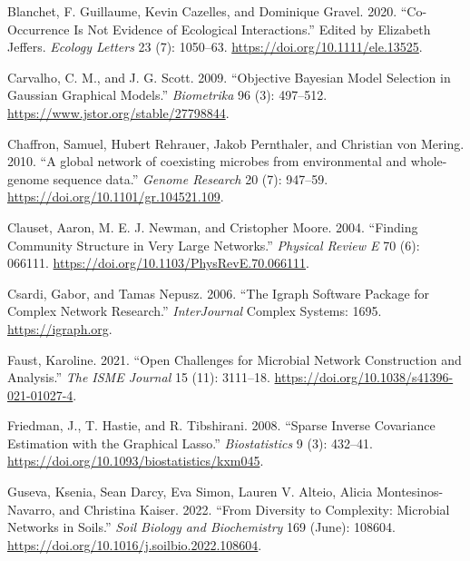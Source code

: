 \documentclass[
  a4paper,
]{article}
\newlength{\cslhangindent}
\newlength{\cslentryspacingunit} %
\newenvironment{CSLReferences}[2] %
 {%
  \setlength{\parindent}{0pt}
  \ifodd #1
  \let\oldpar\par
  \def\par{\hangindent=\cslhangindent\oldpar}
  \fi
  \setlength{\parskip}{#2\cslentryspacingunit}
 }%
 {}
\begin{document}
\hypertarget{refs}{}
\begin{CSLReferences}{1}{0}
\leavevmode{}%
Blanchet, F. Guillaume, Kevin Cazelles, and Dominique Gravel. 2020.
{``Co{-}Occurrence Is Not Evidence of Ecological Interactions.''} Edited
by Elizabeth Jeffers. \emph{Ecology Letters} 23 (7): 1050--63.
\url{https://doi.org/10.1111/ele.13525}.

\leavevmode{}%
Carvalho, C. M., and J. G. Scott. 2009. {``Objective Bayesian Model
Selection in Gaussian Graphical Models.''} \emph{Biometrika} 96 (3):
497--512. \url{https://www.jstor.org/stable/27798844}.

\leavevmode{}%
Chaffron, Samuel, Hubert Rehrauer, Jakob Pernthaler, and Christian von
Mering. 2010. {``A global network of coexisting microbes from
environmental and whole-genome sequence data.''} \emph{Genome Research}
20 (7): 947--59. \url{https://doi.org/10.1101/gr.104521.109}.

\leavevmode{}%
Clauset, Aaron, M. E. J. Newman, and Cristopher Moore. 2004. {``Finding
Community Structure in Very Large Networks.''} \emph{Physical Review E}
70 (6): 066111. \url{https://doi.org/10.1103/PhysRevE.70.066111}.

\leavevmode{}%
Csardi, Gabor, and Tamas Nepusz. 2006. {``The Igraph Software Package
for Complex Network Research.''} \emph{InterJournal} Complex Systems:
1695. \url{https://igraph.org}.

\leavevmode{}%
Faust, Karoline. 2021. {``Open Challenges for Microbial Network
Construction and Analysis.''} \emph{The ISME Journal} 15 (11): 3111--18.
\url{https://doi.org/10.1038/s41396-021-01027-4}.

\leavevmode{}%
Friedman, J., T. Hastie, and R. Tibshirani. 2008. {``Sparse Inverse
Covariance Estimation with the Graphical Lasso.''} \emph{Biostatistics}
9 (3): 432--41. \url{https://doi.org/10.1093/biostatistics/kxm045}.

\leavevmode{}%
Guseva, Ksenia, Sean Darcy, Eva Simon, Lauren V. Alteio, Alicia
Montesinos-Navarro, and Christina Kaiser. 2022. {``From Diversity to
Complexity: Microbial Networks in Soils.''} \emph{Soil Biology and
Biochemistry} 169 (June): 108604.
\url{https://doi.org/10.1016/j.soilbio.2022.108604}.


\end{CSLReferences}
\end{document}
